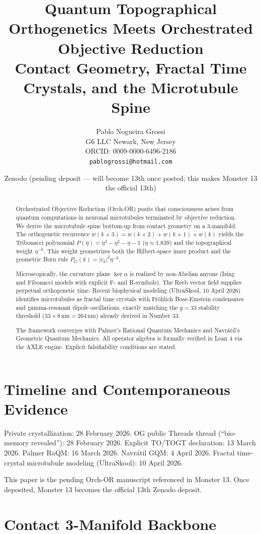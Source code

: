 \documentclass[11pt,a4paper]{article}
\title{\textbf{Quantum Topographical Orthogenetics Meets Orchestrated Objective Reduction}\\
       \large Contact Geometry, Fractal Time Crystals, and the Microtubule Spine}
\author{Pablo Nogueira Grossi \\
        G6 LLC \quad Newark, New Jersey \\
        ORCID: 0009-0000-6496-2186 \\
        \texttt{pablogrossi@hotmail.com}}
\date{Zenodo (pending deposit — will become 13th once posted; this makes Monster 13 the official 13th)}
\begin{document}
\maketitle

\begin{abstract}
Orchestrated Objective Reduction (Orch-OR) posits that consciousness arises from quantum computations in neuronal microtubules terminated by objective reduction. We derive the microtubule spine bottom-up from contact geometry on a 3-manifold. The orthogenetic recurrence \(w(k+3)=w(k+2)+w(k+1)+w(k)\) yields the Tribonacci polynomial \(P(\eta)=\eta^3-\eta^2-\eta-1\) (\(\eta\approx1.839\)) and the topographical weight \(\eta^{-k}\). This weight geometrizes both the Hilbert-space inner product and the geometric Born rule \(P_G(k)=|c_k|^2\eta^{-k}\).

Microscopically, the curvature plane \(\ker\alpha\) is realized by non-Abelian anyons (Ising and Fibonacci models with explicit F- and R-symbols). The Reeb vector field supplies perpetual orthogenetic time. Recent biophysical modeling (UltraSkool, 10 April 2026) identifies microtubules as fractal time crystals with Fröhlich Bose-Einstein condensates and gamma-resonant dipole oscillations, exactly matching the \(g=33\) stability threshold (\(33\times8\,\text{nm}=264\,\text{nm}\)) already derived in Number 33.

The framework converges with Palmer’s Rational Quantum Mechanics and Navrátil’s Geometric Quantum Mechanics. All operator algebra is formally verified in Lean 4 via the AXLE engine. Explicit falsifiability conditions are stated.
\end{abstract}

\section{Timeline and Contemporaneous Evidence}

Private crystallization: 28 February 2026.  
OG public Threads thread (“bio-memory revealed”): 28 February 2026.  
Explicit TO/TOGT declaration: 13 March 2026.  
Palmer RaQM: 16 March 2026.  
Navrátil GQM: 4 April 2026.  
Fractal time-crystal microtubule modeling (UltraSkool): 10 April 2026.

This paper is the pending Orch-OR manuscript referenced in Monster 13. Once deposited, Monster 13 becomes the official 13th Zenodo deposit.

\section{Contact 3-Manifold Backbone}
\end{document}
